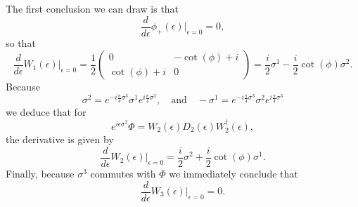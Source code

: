 \documentclass[12pt]{amsart}
\theoremstyle{definition}
\theoremstyle{remark}
\numberwithin{equation}{section}
\begin{document}
The first conclusion we can draw is that
\begin{equation}
	\frac{d}{d\epsilon}\phi_+(\epsilon)\bigg|_{\epsilon = 0} = 0,
\end{equation}
so that
\begin{equation}
	\frac{d}{d\epsilon} W_1(\epsilon)\bigg|_{\epsilon =0} = \frac{1}{{2}}\begin{pmatrix} 0 & -\cot(\phi)+i\\ \cot(\phi)+i & 0\end{pmatrix} = \frac{i}{2}\sigma^1 -\frac{i}{2}\cot(\phi)\sigma^2.
\end{equation}
Because
\begin{equation}
	\sigma^2 = e^{-i\frac{\pi}{4}\sigma^3}\sigma^1e^{i\frac{\pi}{4}\sigma^3}, \quad \text{and}\quad -\sigma^1 = e^{-i\frac{\pi}{4}\sigma^3}\sigma^2e^{i\frac{\pi}{4}\sigma^3}
\end{equation}
we deduce that for 
\begin{equation}
	e^{i\epsilon \sigma^2}\Phi = W_2(\epsilon) D_2(\epsilon) W_2^\dag(\epsilon),
\end{equation}
the derivative is given by
\begin{equation}
	\frac{d}{d\epsilon} W_2(\epsilon)\bigg|_{\epsilon =0} = \frac{i}{2}\sigma^2 +\frac{i}{2}\cot(\phi)\sigma^1.
\end{equation}
Finally, because $\sigma^3$ commutes with $\Phi$ we immediately conclude that
\begin{equation}
	\frac{d}{d\epsilon} W_3(\epsilon)\bigg|_{\epsilon =0} = 0.
\end{equation}
\end{document}
